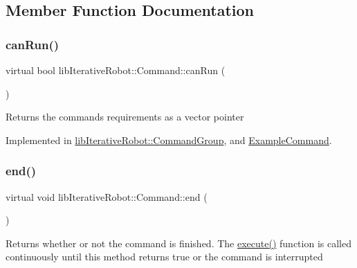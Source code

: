 \subsection{Member Function Documentation}
\mbox{\label{classlib_iterative_robot_1_1_command_aebef0fdf029a15ee48fbb778c4265609}} 
\subsubsection{\texorpdfstring{canRun()}{canRun()}}
{\footnotesize\ttfamily virtual bool lib\+Iterative\+Robot\+::\+Command\+::can\+Run (\begin{DoxyParamCaption}{ }\end{DoxyParamCaption})\hspace{0.3cm}{\ttfamily [pure virtual]}}

Returns the command\textquotesingle{}s requirements as a vector pointer 

Implemented in \mbox{\hyperlink{classlib_iterative_robot_1_1_command_group_abd75c9b52e6b4ae5af1b6724e865311f}{lib\+Iterative\+Robot\+::\+Command\+Group}}, and \mbox{\hyperlink{class_example_command_ad1df0170d99bcef6c6bc1676551f9539}{Example\+Command}}.

\mbox{\label{classlib_iterative_robot_1_1_command_ab30847f09859387b70bb7846f7ce7ca4}} 
\subsubsection{\texorpdfstring{end()}{end()}}
{\footnotesize\ttfamily virtual void lib\+Iterative\+Robot\+::\+Command\+::end (\begin{DoxyParamCaption}{ }\end{DoxyParamCaption})\hspace{0.3cm}{\ttfamily [pure virtual]}}

Returns whether or not the command is finished. The \mbox{\hyperlink{classlib_iterative_robot_1_1_command_a4b38164af1a8645fae2fdae296317cf4}{execute()}} function is called continuously until this method returns true or the command is interrupted 

